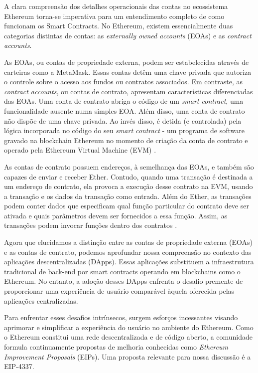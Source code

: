 \documentclass[12pt]{article}
\begin{document}
A clara compreensão dos detalhes operacionais das contas no ecossistema Ethereum torna-se
imperativa para um entendimento completo de como funcionam os Smart Contracts. No Ethereum, existem
essencialmente duas categorias distintas de contas: as \textit{externally owned accounts} (EOAs) e
as \textit{contract accounts}.

As EOAs, ou contas de propriedade externa, podem ser estabelecidas através de carteiras como a
MetaMask. Essas contas detêm uma chave privada que autoriza o controle sobre o acesso aos fundos ou
contratos associados. Em contraste, as \textit{contract accounts}, ou contas de contrato,
apresentam características diferenciadas das EOAs. Uma conta de contrato abriga o código de um
\textit{smart contract}, uma funcionalidade ausente numa simples EOA. Além disso, uma conta de
contrato não dispõe de uma chave privada. Ao invés disso, é detida (e controlada) pela lógica
incorporada no código do seu \textit{smart contract} - um programa de software gravado na
blockchain Ethereum no momento de criação da conta de contrato e operado pela Ethereum Virtual
Machine (EVM) \cite{Antonopoulos2018}.

As contas de contrato possuem endereços, à semelhança das EOAs, e também são capazes de enviar e
receber Ether. Contudo, quando uma transação é destinada a um endereço de contrato, ela provoca a
execução desse contrato na EVM, usando a transação e os dados da transação como entrada. Além do
Ether, as transações podem conter dados que especificam qual função particular do contrato deve ser
ativada e quais parâmetros devem ser fornecidos a essa função. Assim, as transações podem invocar
funções dentro dos contratos \cite{Antonopoulos2018}.

Agora que elucidamos a distinção entre as contas de propriedade externa (EOAs) e as contas de
contrato, podemos aprofundar nossa compreensão no contexto das aplicações descentralizadas (DApps).
Essas aplicações substituem a infraestrutura tradicional de back-end por smart contracts operando
em blockchains como o Ethereum. No entanto, a adoção desses DApps enfrenta o desafio premente de
proporcionar uma experiência de usuário comparável àquela oferecida pelas aplicações centralizadas.

Para enfrentar esses desafios intrínsecos, surgem esforços incessantes visando aprimorar e
simplificar a experiência do usuário no ambiente do Ethereum. Como o Ethereum constitui uma rede
descentralizada e de código aberto, a comunidade formula continuamente propostas de melhoria
conhecidas como \textit{Ethereum Improvement Proposals} (EIPs). Uma proposta relevante para nossa
discussão é a EIP-4337.\cite{Buterin2021}
\end{document}
